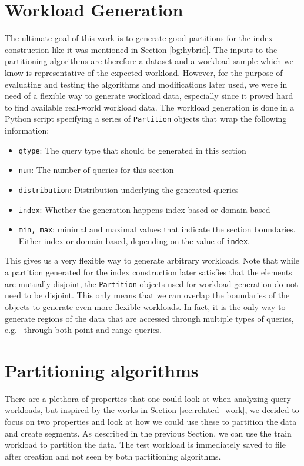 \section{Workload Generation}
The ultimate goal of this work is to generate good partitions for the index construction like it was mentioned in Section \ref{bg:hybrid}. The inputs to the partitioning algorithms are therefore a dataset and a workload sample which we know is representative of the expected workload. However, for the purpose of evaluating and testing the algorithms and modifications later used, we were in need of a flexible way to generate workload data, especially since it proved hard to find available real-world workload data. The workload generation is done in a Python script specifying a series of \verb|Partition| objects that wrap the following information:

\begin{itemize}
    \item \verb|qtype|: The query type that should be generated in this section
    \item \verb|num|: The number of queries for this section
    \item \verb|distribution|: Distribution underlying the generated queries
    \item \verb|index|: Whether the generation happens index-based or domain-based
    \item \verb|min, max|: minimal and maximal values that indicate the section boundaries. Either index or domain-based, depending on the value of \verb|index|.
\end{itemize}

This gives us a very flexible way to generate arbitrary workloads. Note that while a partition generated for the index construction later satisfies that the elements are mutually disjoint, the \verb|Partition| objects used for workload generation do not need to be disjoint. This only means that we can overlap the boundaries of the objects to generate even more flexible workloads. In fact, it is the only way to generate regions of the data that are accessed through multiple types of queries, e.g.~ through both point and range queries. 

\section{Partitioning algorithms}
There are a plethora of properties that one could look at when analyzing query workloads, but inspired by the works in Section \ref{sec:related_work}, we decided to focus on two properties and look at how we could use these to partition the data and create segments. As described in the previous Section, we can use the train workload to partition the data. The test workload is immediately saved to file after creation and not seen by both partitioning algorithms. 

